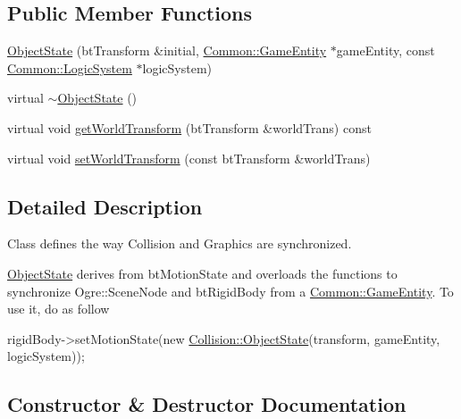 \subsection*{Public Member Functions}
\begin{DoxyCompactItemize}
\item 
\hyperlink{class_collision_1_1_object_state_acd780ba908aac6389fc4b22a9257658a}{Object\+State} (bt\+Transform \&initial, \hyperlink{struct_common_1_1_game_entity}{Common\+::\+Game\+Entity} $\ast$game\+Entity, const \hyperlink{class_common_1_1_logic_system}{Common\+::\+Logic\+System} $\ast$logic\+System)
\item 
virtual \hyperlink{class_collision_1_1_object_state_a22a49e4cf7522a2b47fb128af6f65dc6}{$\sim$\+Object\+State} ()
\item 
virtual void \hyperlink{class_collision_1_1_object_state_a2bfa06b1f231cad379fbbd6a86cb9ac9}{get\+World\+Transform} (bt\+Transform \&world\+Trans) const
\item 
virtual void \hyperlink{class_collision_1_1_object_state_a7aeced5d3e1ae27eb7a31f2604ab227c}{set\+World\+Transform} (const bt\+Transform \&world\+Trans)
\end{DoxyCompactItemize}


\subsection{Detailed Description}
Class defines the way Collision and Graphics are synchronized. 

\hyperlink{class_collision_1_1_object_state}{Object\+State} derives from bt\+Motion\+State and overloads the functions to synchronize Ogre\+::\+Scene\+Node and bt\+Rigid\+Body from a \hyperlink{struct_common_1_1_game_entity}{Common\+::\+Game\+Entity}. To use it, do as follow 
\begin{DoxyCode}
rigidBody->setMotionState(\textcolor{keyword}{new} \hyperlink{class_collision_1_1_object_state}{Collision::ObjectState}(transform, gameEntity, 
      logicSystem));
\end{DoxyCode}
 

\subsection{Constructor \& Destructor Documentation}
\mbox{\label{class_collision_1_1_object_state_acd780ba908aac6389fc4b22a9257658a}} 
